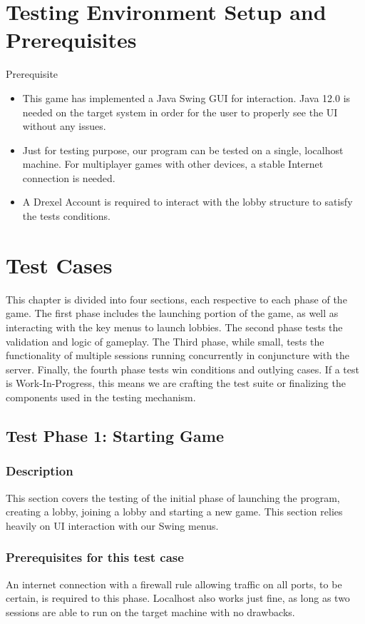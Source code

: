 \documentclass{scrreprt}
\begin{document}
\chapter{Testing Environment Setup and Prerequisites}

Prerequisite
\begin{itemize}
  \item This game has implemented a Java Swing GUI for interaction. Java 12.0 is needed on the target system in order for the user to properly see the UI without any issues.
  \item Just for testing purpose, our program can be tested on a single, localhost machine. For multiplayer games with other devices, a stable Internet connection is needed.
  \item A Drexel Account is required to interact with the lobby structure to satisfy the tests conditions.
\end{itemize}

\chapter{Test Cases}

This chapter is divided into four sections, each respective to each phase of the game. The first phase includes the launching portion of the game, as well as interacting with the key menus to launch lobbies. The second phase tests the validation and logic of gameplay. The Third phase, while small, tests the functionality of multiple sessions running concurrently in conjuncture with the server. Finally, the fourth phase tests win conditions and outlying cases. If a test is Work-In-Progress, this means we are crafting the test suite or finalizing the components used in the testing mechanism.

\section{Test Phase 1: Starting Game}

\subsection{Description}
This section covers the testing of the initial phase of launching the program, creating a lobby, joining a lobby and starting a new game. This section relies heavily on UI interaction with our Swing menus.

\subsection{Prerequisites for this test case}
An internet connection with a firewall rule allowing traffic on all ports, to be certain, is required to this phase. Localhost also works just fine, as long as two sessions are able to run on the target machine with no drawbacks. 
\end{document}
